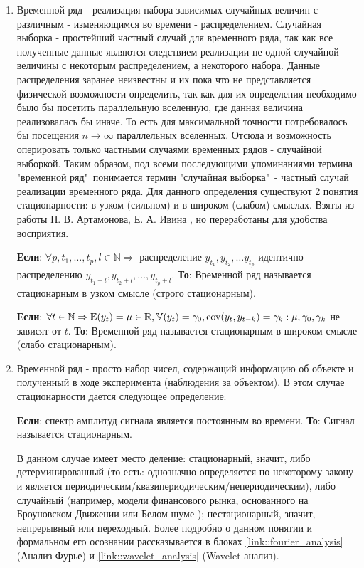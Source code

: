 		\begin{enumerate}
			\item Временной ряд - реализация набора зависимых случайных величин с различным - изменяющимся во времени - распределением. Случайная выборка - простейший частный случай для временного ряда, так как все полученные данные являются следствием реализации не одной случайной величины с некоторым распределением, а некоторого набора. Данные распределения заранее неизвестны и их пока что не представляется физической возможности определить, так как для их определения необходимо было бы посетить параллельную вселенную, где данная величина реализовалась бы иначе. То есть для максимальной точности потребовалось бы посещения $n \to \infty$ параллельных вселенных. Отсюда и возможность оперировать только частными случаями временных рядов - случайной выборкой. Таким образом, под всеми последующими упоминаниями термина "временной ряд"\ понимается термин "случайная выборка"\ - частный случай реализации временного ряда. Для данного определения существуют 2 понятия стационарности: в узком (сильном) и в широком (слабом) смыслах. Взяты из работы  Н. В. Артамонова, Е. А. Ивина \cite{stationarity_of_time_series_econometrics}, но переработаны для удобства восприятия.
			\begin{definition} \label{def::strong_ts_stationarity}
				\textbf{Если}: $\forall p, t_1, \ldots, t_p, l \in \mathbb{N} \Rightarrow$ распределение $y_{t_1}, y_{t_2}, \ldots y_{t_p}$ идентично распределению $y_{t_1 + l}, y_{t_2 + l}, \ldots, y_{t_p + l}$. \textbf{То}: Временной ряд называется стационарным в узком смысле (строго стационарным).
			\end{definition}
			\begin{definition} \label{def::weak_ts_stationarity}
				\textbf{Если}: $\forall t \in \mathbb{N} \Rightarrow \mathbb{E}(y_t) = \mu \in \mathbb{R}, \mathbb{V}(y_t) = \gamma_0, \text{cov}(y_t, y_{t - k}) = \gamma_k: \mu, \gamma_0, \gamma_k$ не зависят от $t$. \textbf{То}: Временной ряд называется стационарным в широком смысле (слабо стационарным).
			\end{definition}
 			\item Временной ряд - просто набор чисел, содержащий информацию об объекте и полученный в ходе эксперимента (наблюдения за объектом). В этом случае стационарности дается следующее определение:
 			\begin{definition} \label{def::signal_stationarity}
 				\textbf{Если}: спектр амплитуд сигнала является постоянным во времени. \textbf{То}: Сигнал называется стационарным.
 			\end{definition}
 			В данном случае имеет место деление: стационарный, значит, либо детерминированный (то есть: однозначно определяется по некоторому закону и является периодическим/квазипериодическим/непериодическим), либо случайный (например, модели финансового рынка, основанного на Броуновском Движении \cite{brownian_motion_for_stochastic_differential_equation} или Белом шуме \cite{white_noise_for_stochastic_differential_equation}); нестационарный, значит, непрерывный или переходный. Более подробно о данном понятии и формальном его осознании рассказывается в блоках \ref{link::fourier_analysis} (Анализ Фурье) и \ref{link::wavelet_analysis} (Wavelet анализ).
		\end{enumerate}
